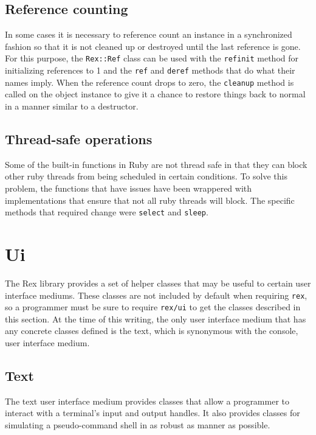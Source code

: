\documentclass{report}
\begin{document}
        \subsection{Reference counting}

\par
In some cases it is necessary to reference count an instance in a
synchronized fashion so that it is not cleaned up or destroyed until
the last reference is gone.  For this purpose, the \texttt{Rex::Ref}
class can be used with the \texttt{refinit} method for initializing
references to 1 and the \texttt{ref} and \texttt{deref} methods that
do what their names imply.  When the reference count drops to zero,
the \texttt{cleanup} method is called on the object instance to give
it a chance to restore things back to normal in a manner similar to
a destructor.

        \subsection{Thread-safe operations}

\par
Some of the built-in functions in Ruby are not thread safe in that
they can block other ruby threads from being scheduled in certain
conditions.  To solve this problem, the functions that have issues
have been wrappered with implementations that ensure that not all
ruby threads will block.  The specific methods that required change
were \texttt{select} and \texttt{sleep}.

    \section{Ui}

\par
The Rex library provides a set of helper classes that may be useful
to certain user interface mediums.  These classes are not included
by default when requiring \texttt{rex}, so a programmer must be sure
to require \texttt{rex/ui} to get the classes described in this
section.  At the time of this writing, the only user interface
medium that has any concrete classes defined is the text, which is
synonymous with the console, user interface medium.

        \subsection{Text}

\par
The text user interface medium provides classes that allow a
programmer to interact with a terminal's input and output handles.
It also provides classes for simulating a pseudo-command shell in as
robust as manner as possible.
\end{document}
